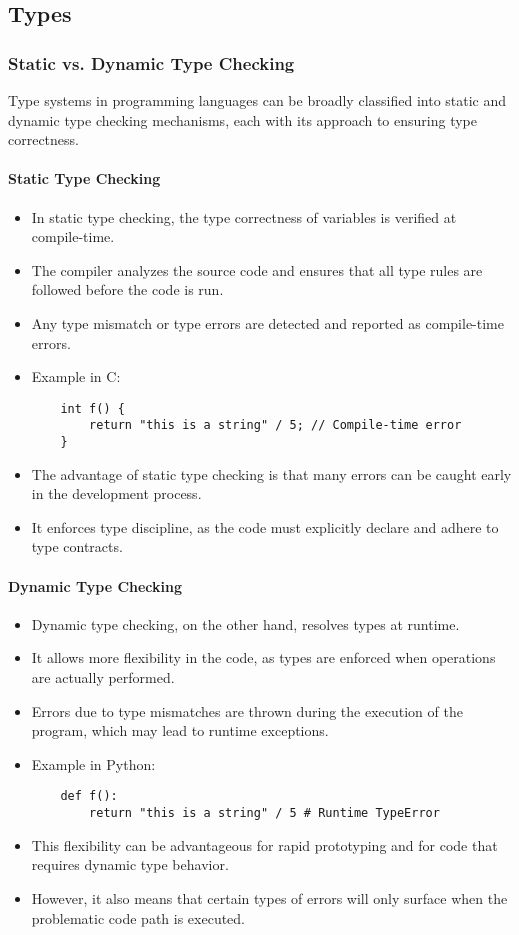 \documentclass[12pt]{article}
\begin{document}
\subsection{Types}

\subsubsection{Static vs. Dynamic Type Checking}

Type systems in programming languages can be broadly classified into static and dynamic type checking mechanisms, each with its approach to ensuring type correctness.

\paragraph{Static Type Checking}
\begin{itemize}
    \item In static type checking, the type correctness of variables is verified at compile-time.
    \item The compiler analyzes the source code and ensures that all type rules are followed before the code is run.
    \item Any type mismatch or type errors are detected and reported as compile-time errors.
    \item Example in C:
    \begin{verbatim}
    int f() {
        return "this is a string" / 5; // Compile-time error
    }
    \end{verbatim}
    \item The advantage of static type checking is that many errors can be caught early in the development process.
    \item It enforces type discipline, as the code must explicitly declare and adhere to type contracts.
\end{itemize}

\paragraph{Dynamic Type Checking}
\begin{itemize}
    \item Dynamic type checking, on the other hand, resolves types at runtime.
    \item It allows more flexibility in the code, as types are enforced when operations are actually performed.
    \item Errors due to type mismatches are thrown during the execution of the program, which may lead to runtime exceptions.
    \item Example in Python:
    \begin{verbatim}
    def f():
        return "this is a string" / 5 # Runtime TypeError
    \end{verbatim}
    \item This flexibility can be advantageous for rapid prototyping and for code that requires dynamic type behavior.
    \item However, it also means that certain types of errors will only surface when the problematic code path is executed.
\end{itemize}
\end{document}
